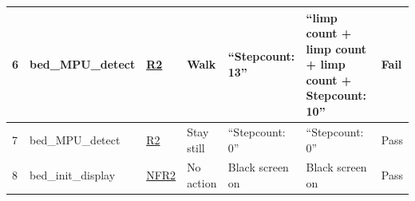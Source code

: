 \documentclass[12pt, titlepage]{article}
\begin{document}
\begin{center}
\begin{table} [H]
\begin{tabular}{ | p{0.5cm} | p{2.8cm} |  p{1.1cm} | p{2.7cm} | p{2.7cm} | p{2.7cm} | p{1.1cm} |}
\hline
6 & bed\_MPU\newline \_detect & \href{https://github.com/zakerl/Capstone_Project/blob/main/docs/SRS/SRS.pdf}{R2} & Walk & “Stepcount: 13” & “limp count + limp count + limp count + Stepcount: 10” & Fail \\ 
\hline
7 & bed\_MPU\newline \_detect & \href{https://github.com/zakerl/Capstone_Project/blob/main/docs/SRS/SRS.pdf}{R2} & Stay still & “Stepcount: 0” & “Stepcount: 0” & Pass \\ 
\hline
8 & bed\_init\_display & \href{https://github.com/zakerl/Capstone_Project/blob/main/docs/SRS/SRS.pdf}{NFR2} & No action & Black screen on & Black screen on & Pass \\ 
\hline
\end{tabular}
\end{table}
\end{center}
\end{document}
